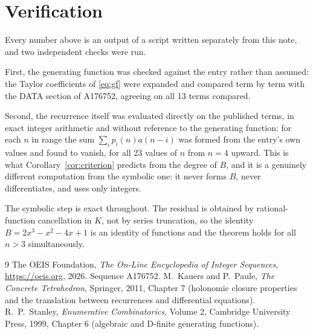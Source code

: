 \documentclass[11pt,a4paper]{article}
\theoremstyle{plain}
\theoremstyle{definition}
\begin{document}
\section{Verification}

Every number above is an output of a script written separately from this note, and two
independent checks were run.

First, the generating function was checked against the entry rather than assumed: the
Taylor coefficients of \eqref{eq:gf} were expanded and compared term by term with the DATA
section of A176752, agreeing on all 13 terms compared.

Second, the recurrence itself was evaluated directly on the published terms, in exact
integer arithmetic and without reference to the generating function: for each $n$ in range
the sum $\sum_{i}p_{i}(n)a(n-i)$ was formed from the entry's own values and found to
vanish, for all 23 values of $n$ from $n=4$ upward. This is what
Corollary~\ref{cor:criterion} predicts from the degree of $B$, and it is a genuinely
different computation from the symbolic one: it never forms $B$, never differentiates, and
uses only integers.

The symbolic step is exact throughout. The residual is obtained by rational-function
cancellation in $K$, not by series truncation, so the identity $B=2 x^{3} - x^{2} - 4 x + 1$ is an
identity of functions and the theorem holds for all $n>3$ simultaneously.

\begin{thebibliography}{9}
 The OEIS Foundation, \emph{The On-Line Encyclopedia of Integer Sequences},
\url{https://oeis.org}, 2026. Sequence A176752.
 M.~Kauers and P.~Paule, \emph{The Concrete Tetrahedron}, Springer, 2011,
Chapter 7 (holonomic closure properties and the translation between recurrences and
differential equations).
 R.~P.~Stanley, \emph{Enumerative Combinatorics}, Volume 2, Cambridge
University Press, 1999, Chapter 6 (algebraic and D-finite generating functions).
\end{thebibliography}
\end{document}
